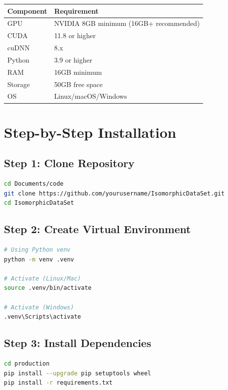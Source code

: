 \documentclass[12pt,a4paper,oneside]{report}
\begin{document}
\begin{table}[H]
\centering
\begin{tabular}{|l|p{6cm}|}
\hline
\textbf{Component} & \textbf{Requirement} \\
\hline
GPU & NVIDIA 8GB minimum (16GB+ recommended) \\
\hline
CUDA & 11.8 or higher \\
\hline
cuDNN & 8.x \\
\hline
Python & 3.9 or higher \\
\hline
RAM & 16GB minimum \\
\hline
Storage & 50GB free space \\
\hline
OS & Linux/macOS/Windows \\
\hline
\end{tabular}
\end{table}

\section{Step-by-Step Installation}

\subsection{Step 1: Clone Repository}

\begin{lstlisting}[language=Bash, caption=Clone Repository]
cd Documents/code
git clone https://github.com/yourusername/IsomorphicDataSet.git
cd IsomorphicDataSet
\end{lstlisting}

\subsection{Step 2: Create Virtual Environment}

\begin{lstlisting}[language=Bash, caption=Create Virtual Environment]
# Using Python venv
python -m venv .venv

# Activate (Linux/Mac)
source .venv/bin/activate

# Activate (Windows)
.venv\Scripts\activate
\end{lstlisting}

\subsection{Step 3: Install Dependencies}

\begin{lstlisting}[language=Bash, caption=Install Dependencies]
cd production
pip install --upgrade pip setuptools wheel
pip install -r requirements.txt
\end{lstlisting}
\end{document}
